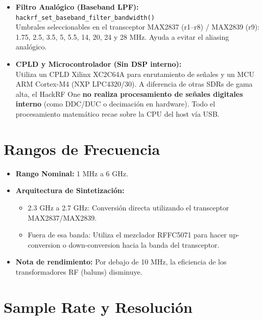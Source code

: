 \documentclass[11pt]{article}
\begin{document}
\begin{itemize}
    \item \textbf{Filtro Analógico (Baseband LPF):} \texttt{hackrf\_set\_baseband\_filter\_bandwidth()}\\
    Umbrales seleccionables en el transceptor MAX2837 (r1--r8) / MAX2839 (r9): 1.75, 2.5, 3.5, 5, 5.5, 14, 20, 24 y 28 MHz. Ayuda a evitar el aliasing analógico.
    \item \textbf{CPLD y Microcontrolador (Sin DSP interno):}\\
    Utiliza un CPLD Xilinx XC2C64A para enrutamiento de señales y un MCU ARM Cortex-M4 (NXP LPC4320/30). A diferencia de otras SDRs de gama alta, el HackRF One \textbf{no realiza procesamiento de señales digitales interno} (como DDC/DUC o decimación en hardware). Todo el procesamiento matemático recae sobre la CPU del host vía USB.
\end{itemize}

\section{Rangos de Frecuencia}

\begin{itemize}
    \item \textbf{Rango Nominal:} 1 MHz a 6 GHz.
    \item \textbf{Arquitectura de Sintetización:}
    \begin{itemize}
        \item 2.3 GHz a 2.7 GHz: Conversión directa utilizando el transceptor MAX2837/MAX2839.
        \item Fuera de esa banda: Utiliza el mezclador RFFC5071 para hacer up-conversion o down-conversion hacia la banda del transceptor.
    \end{itemize}
    \item \textbf{Nota de rendimiento:} Por debajo de 10 MHz, la eficiencia de los transformadores RF (baluns) disminuye.
\end{itemize}

\section{Sample Rate y Resolución}
\end{document}

